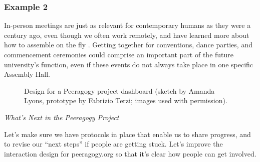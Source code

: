 \subsubsection*{Example 2} In-person meetings are just as relevant for contemporary humans as they were a century ago, even though we often work remotely, and have learned more about how to assemble on the fly \cite{rheingold2007smart}.  Getting together for conventions, dance parties, and commencement ceremonies could comprise an important part of the future university's  function, even if these events do not always take place in one specific Assembly Hall.


\begin{figure}[t]
{\centering
{}

\par}
\caption{Design for a Peeragogy project dashboard (sketch by Amanda Lyons, prototype by Fabrizio Terzi; images used with permission).\label{dashboard}}
\end{figure}

\FloatBarrier

\begin{framed}
\noindent 
\emph{What's Next in the Peeragogy Project}
\begin{collectinmacro}{\WrapperWN}{}{}
Let's make sure we have protocols in place that enable us to share
progress, and to revise our ``next steps'' if people are getting
stuck.  Let's improve the interaction design for peeragogy.org so that
it's clear how people can get involved.
\end{collectinmacro}
\WrapperWN
\end{framed}    


